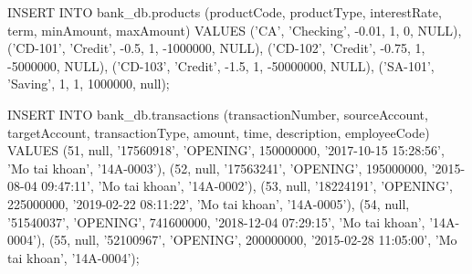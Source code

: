 \begin{itemize}
    \begin{MySQLCode}
        INSERT INTO bank_db.products 
        (productCode, productType, interestRate, term, minAmount, maxAmount)
        VALUES  
        ('CA', 'Checking', -0.01, 1, 0, NULL),
        ('CD-101', 'Credit', -0.5, 1, -1000000, NULL),
        ('CD-102', 'Credit', -0.75, 1, -5000000, NULL),
        ('CD-103', 'Credit', -1.5, 1, -50000000, NULL),
        ('SA-101', 'Saving', 1, 1, 1000000, null);
    \end{MySQLCode}

    \begin{MySQLCode}
        INSERT INTO bank_db.transactions
        (transactionNumber, sourceAccount, targetAccount, transactionType, amount, time, description, employeeCode)
        VALUES
        (51, null, '17560918', 'OPENING', 150000000, '2017-10-15 15:28:56', 'Mo tai khoan', '14A-0003'),
        (52, null, '17563241', 'OPENING', 195000000, '2015-08-04 09:47:11', 'Mo tai khoan', '14A-0002'),
        (53, null, '18224191', 'OPENING', 225000000, '2019-02-22 08:11:22', 'Mo tai khoan', '14A-0005'),
        (54, null, '51540037', 'OPENING', 741600000, '2018-12-04 07:29:15', 'Mo tai khoan', '14A-0004'),
        (55, null, '52100967', 'OPENING', 200000000, '2015-02-28 11:05:00', 'Mo tai khoan', '14A-0004');
    \end{MySQLCode}
    
\end{itemize}
